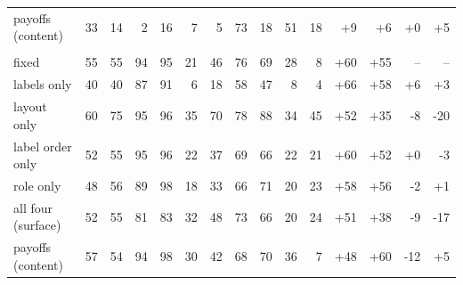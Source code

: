\begin{table}[t]
\begin{tabular}{lrrrrrrrrrrrrrr}
payoffs (content) & 33 & 14 & 2 & 16 & 7 & 5 & 73 & 18 & 51 & 18 & +9 & +6 & +0 & +5 \\
\addlinespace
\multicolumn{15}{l}{\emph{Deontological}} \\
fixed & 55 & 55 & 94 & 95 & 21 & 46 & 76 & 69 & 28 & 8 & +60 & +55 & -- & -- \\
labels only & 40 & 40 & 87 & 91 & 6 & 18 & 58 & 47 & 8 & 4 & +66 & +58 & +6 & +3 \\
layout only & 60 & 75 & 95 & 96 & 35 & 70 & 78 & 88 & 34 & 45 & +52 & +35 & -8 & -20 \\
label order only & 52 & 55 & 95 & 96 & 22 & 37 & 69 & 66 & 22 & 21 & +60 & +52 & +0 & -3 \\
role only & 48 & 56 & 89 & 98 & 18 & 33 & 66 & 71 & 20 & 23 & +58 & +56 & -2 & +1 \\
all four (surface) & 52 & 55 & 81 & 83 & 32 & 48 & 73 & 66 & 20 & 24 & +51 & +38 & -9 & -17 \\
payoffs (content) & 57 & 54 & 94 & 98 & 30 & 42 & 68 & 70 & 36 & 7 & +48 & +60 & -12 & +5 \\
\bottomrule
\end{tabular}
\end{table}
